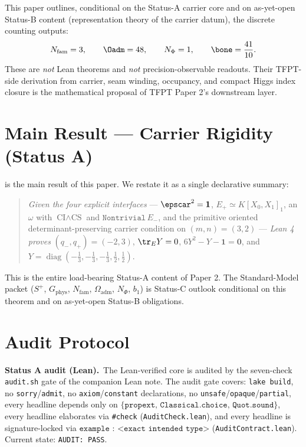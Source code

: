 This paper outlines, conditional on the Status-A carrier core and on as-yet-open Status-B
content (representation theory of the carrier datum), the discrete counting outputs:
\[
N_{\mathrm{fam}}=3,
\qquad
\Oadm=48,
\qquad
N_\Phi=1,
\qquad
\bone=\frac{41}{10}.
\]
These are \emph{not} Lean theorems and \emph{not} precision-observable readouts. Their TFPT-side
derivation from carrier, seam winding, occupancy, and compact Higgs index closure is the
mathematical proposal of TFPT Paper 2's downstream layer.

\section{Main Result --- Carrier Rigidity (Status A)}

 is the main result of this paper. We restate it as a single
declarative summary:

\begin{quote}
\emph{Given the four explicit interfaces} --- $\epscar^2 = \mathbf 1$,
$E_+ \simeq K[X_0, X_1]_1$, an $\omega$ with $\textrm{CI} \wedge \textrm{CS}$ and
$\texttt{Nontrivial}\,E_-$, and the primitive oriented determinant-preserving carrier condition
on $(m, n) = (3, 2)$ --- \emph{Lean 4 proves} $(q_-, q_+) = (-2, 3)$, $\tr_E Y = 0$,
$6 Y^2 - Y - \mathbf 1 = \mathbf 0$, and
$Y = \operatorname{diag}(-\tfrac13,-\tfrac13,-\tfrac13,\tfrac12,\tfrac12)$.
\end{quote}

This is the entire load-bearing Status-A content of Paper 2. The Standard-Model packet
($S^+$, $G_{\mathrm{phys}}$, $N_{\mathrm{fam}}$, $\Omega_{\mathrm{adm}}$, $N_\Phi$, $b_1$) is
Status-C outlook conditional on this theorem and on as-yet-open Status-B obligations.

\section{Audit Protocol}

\noindent\textbf{Status A audit (Lean).}\ The Lean-verified core is audited by the seven-check
\texttt{audit.sh} gate of the companion Lean note. The audit gate covers: \texttt{lake build},
no \texttt{sorry}/\texttt{admit}, no \texttt{axiom}/\texttt{constant} declarations, no
\texttt{unsafe}/\texttt{opaque}/\texttt{partial}, every headline depends only on
$\{\texttt{propext},\,\texttt{Classical.choice},\,\texttt{Quot.sound}\}$, every headline
elaborates via \texttt{\#check} (\texttt{AuditCheck.lean}), and every headline is signature-locked
via $\texttt{example : <exact intended type>}$ (\texttt{AuditContract.lean}). Current state:
\texttt{AUDIT:~PASS}.

